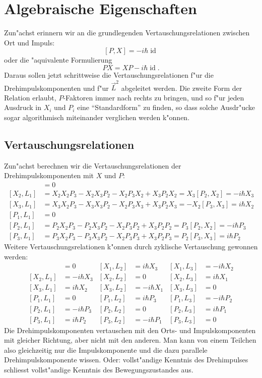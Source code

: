 \section{Algebraische Eigenschaften\label{section:drehimpulsalgebra}}
Zun"achst erinnern wir an die grundlegenden Vertauschungsrelationen zwischen
Ort und Impuls:
\[
[P,X]=-i\hbar \operatorname{id}
\]
oder die "aquivalente Formulierung
\[
PX=XP-i\hbar \operatorname{id}.
\]
Daraus sollen jetzt schrittweise die Vertauschungsrelationen f"ur die
Drehimpulskomponenten und f"ur $\vec L^2$ abgeleitet werden.
Die zweite Form der Relation erlaubt, $P$-Faktoren immer nach rechts zu
bringen, und so f"ur jeden Ausdruck in $X_i$ und $P_i$ eine
``Standardform'' zu finden, so dass solche Ausdr"ucke sogar algorithmisch
miteinander verglichen werden k"onnen.

\subsection{Vertauschungsrelationen}
Zun"achst berechnen wir die Vertauschungsrelationen der
Drehimpulskomponenten mit $X$ und $P$:
\begin{align*}
[X_1,L_1]&=0\\
[X_2,L_1]
&=
X_2X_2P_3-X_2X_3P_2-X_2P_3X_2+X_3P_2X_2
=X_3[P_2,X_2]
=-i\hbar X_3
\\
[X_3,L_1]
&=
X_3X_2P_3-X_3X_3P_2-X_2P_3X_3+X_3P_2X_3
=
-X_2[P_3,X_3]
=
i\hbar X_2
\\
[P_1,L_1]&=0\\
[P_2,L_1]
&=
P_2X_2P_3 - P_2X_3P_2 - X_2P_3P_2 + X_3P_2P_2
=
P_3[P_2,X_2]
=
-i\hbar P_3
\\
[P_3,L_1]
&=
P_3X_2P_3 - P_3X_3P_2 - X_2P_3P_3 + X_3P_2P_3
=
P_2[P_3,X_3]=i\hbar P_2
\end{align*}
Weitere Vertauschungsrelationen k"onnen durch zyklische Vertauschung
gewonnen werden:
\begin{align*}
[X_1,L_1] &= 0          & [X_1,L_2] &= i\hbar X_3 & [X_1,L_3] &=-i\hbar X_2\\
[X_2,L_1] &=-i\hbar X_3 & [X_2,L_2] &= 0          & [X_2,L_3] &= i\hbar X_1\\
[X_3,L_1] &= i\hbar X_2 & [X_3,L_2] &=-i\hbar X_1 & [X_3,L_3] &= 0         \\
[P_1,L_1] &= 0          & [P_1,L_2] &= i\hbar P_3 & [P_1,L_3] &=-i\hbar P_2\\
[P_2,L_1] &=-i\hbar P_3 & [P_2,L_2] &= 0          & [P_2,L_3] &= i\hbar P_1\\
[P_3,L_1] &= i\hbar P_2 & [P_3,L_2] &=-i\hbar P_1 & [P_3,L_3] &= 0
\end{align*}
Die Drehimpulskomponenten vertauschen mit den Orts- und Impulskomponenten
mit gleicher Richtung, aber nicht mit den anderen.
Man kann von einem Teilchen also gleichzeitig nur die Impulskomponente
und die dazu parallele Drehimpulskomponente wissen. 
Oder: vollst"andige Kenntnis des Drehimpulses schliesst vollst"andige
Kenntnis des Bewegungszustandes aus.

